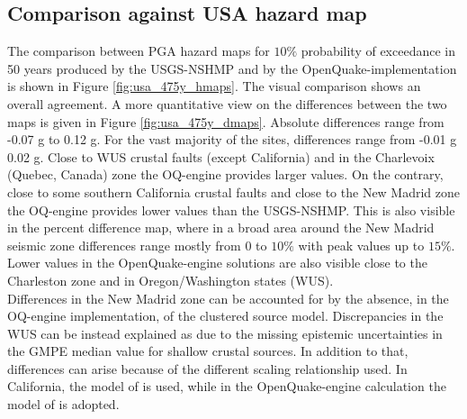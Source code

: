 \subsection{Comparison against USA hazard map}
The comparison between PGA hazard maps for $10\%$ probability of exceedance in 50 years produced by the USGS-NSHMP and by the OpenQuake-implementation is shown in Figure \ref{fig:usa_475y_hmaps}. The visual comparison shows an overall agreement. A more quantitative view on the differences between the two maps is given in Figure \ref{fig:usa_475y_dmaps}. Absolute differences range from -0.07 g to 0.12 g. For the vast majority of the sites, differences range from -0.01 g 0.02 g. Close to WUS crustal faults (except California) and in the Charlevoix (Quebec, Canada) zone the OQ-engine provides larger values. On the contrary, close to some southern California crustal faults and close to the New Madrid zone the OQ-engine provides lower values than the USGS-NSHMP. This is also visible in the percent difference map, where in a broad area around the New Madrid seismic zone differences range mostly from $0$ to $10\%$ with peak values up to $15\%$. Lower values in the OpenQuake-engine solutions are also visible close to the Charleston zone and in Oregon/Washington states (WUS).\\
Differences in the New Madrid zone can be accounted for by the absence, in the OQ-engine implementation, of the clustered source model. Discrepancies in the WUS can be instead explained as due to the missing epistemic uncertainties in the GMPE median value for shallow crustal sources. In addition to that, differences can arise because of the different scaling relationship used. In California, the model of \cite{hanks2002} is used, while in the OpenQuake-engine calculation the model of \cite{wells1994} is adopted.